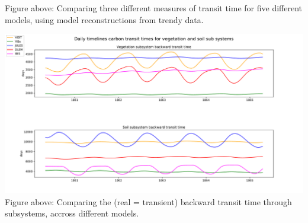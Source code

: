 \documentclass[36pt]{article}
\begin{document}
\begin{tcbposter}
{\begin{multicols}{2}
\begin{center}
  Figure above: Comparing three different measures of transit time for five different models, using
  model reconstructions from trendy data.
\end{center}

\begin{minipage}[b]{\linewidth}
\begin{center}
	\includegraphics[width=\columnwidth]{test_veg_soil.pdf}
  Figure above: Comparing the (real = transient) backward transit time through 
  subsystems, accross different models. 
\end{center}
\end{minipage}


\end{multicols}}
\end{tcbposter}
\end{document}
